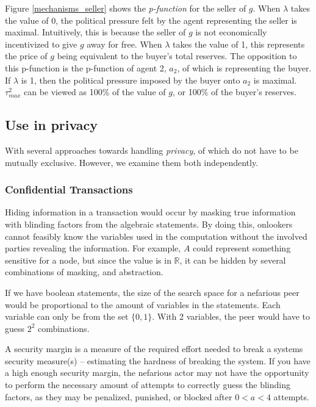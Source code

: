 \documentclass[10pt, titlepage, twocolumn]{report}
\begin{document}
\hspace*{15pt}
Figure \ref{mechanisms_seller} shows the \textit{p-function} for the seller of \(g\). When \(\lambda\) takes the value of 0, the political pressure felt by the agent representing the seller is maximal. Intuitively, this is because the seller of \(g\) is not economically incentivized to give \(g\) away for free. When \(\lambda\) takes the value of 1, this represents the price of \(g\) being equivalent to the buyer's total reserves. The opposition to this p-function is the p-function of agent 2, \(a_2\), of which is representing the buyer. If \(\lambda\) is 1, then the political pressure imposed by the buyer onto \(a_2\) is maximal. \(\tau^2_{max}\) can be viewed as 100\% of the value of \(g\), or 100\% of the buyer's reserves. 



\subsection{Use in privacy}
\hspace*{15pt}
With several approaches towards handling \textit{privacy}, of which do not have to be mutually exclusive. However, we examine them both independently. 


\subsubsection{Confidential Transactions}
\hspace*{15pt}
Hiding information in a transaction would occur by masking true information with blinding factors from the algebraic statements. By doing this, onlookers cannot feasibly know the variables used in the computation without the involved parties revealing the information. For example, \(A\) could represent something sensitive for a node, but since the value is in \(\mathbb{R}\), it can be hidden by several combinations of masking, and abstraction.

\hspace*{15pt}
If we have boolean statements, the size of the search space for a nefarious peer would be proportional to the amount of variables in the statements. Each variable can only be from the set \(\{0,1\}\). With 2 variables, the peer would have to guess \(2^2\) combinations. 

\hspace*{15pt}
A security margin is a measure of the required effort needed to break a systems security measure(s) -- estimating the hardness of breaking the system. If you have a high enough security margin, the nefarious actor may not have the opportunity to perform the necessary amount of attempts to correctly guess the blinding factors, as they may be penalized, punished, or blocked after \(0 < a < 4\) attempts. 
\end{document}
